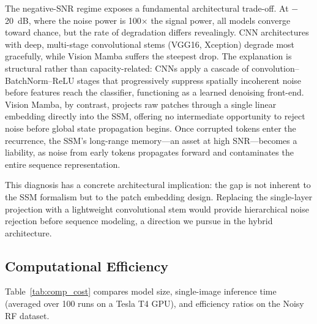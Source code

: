 \documentclass[runningheads]{llncs}
\begin{document}
The negative-SNR regime exposes a fundamental architectural trade-off. At $-$20~dB, where the noise power is 100$\times$ the signal power, all models converge toward chance, but the rate of degradation differs revealingly. CNN architectures with deep, multi-stage convolutional stems (VGG16, Xception) degrade most gracefully, while Vision Mamba suffers the steepest drop. The explanation is structural rather than capacity-related: CNNs apply a cascade of convolution--BatchNorm--ReLU stages that progressively suppress spatially incoherent noise before features reach the classifier, functioning as a learned denoising front-end. Vision Mamba, by contrast, projects raw patches through a single linear embedding directly into the SSM, offering no intermediate opportunity to reject noise before global state propagation begins. Once corrupted tokens enter the recurrence, the SSM's long-range memory---an asset at high SNR---becomes a liability, as noise from early tokens propagates forward and contaminates the entire sequence representation.

This diagnosis has a concrete architectural implication: the gap is not inherent to the SSM formalism but to the patch embedding design. Replacing the single-layer projection with a lightweight convolutional stem would provide hierarchical noise rejection before sequence modeling, a direction we pursue in the hybrid architecture.

\subsection{Computational Efficiency}

Table~\ref{tab:comp_cost} compares model size, single-image inference time (averaged over 100 runs on a Tesla T4 GPU), and efficiency ratios on the Noisy RF dataset.

\begin{table}[htbp]
\centering
\caption{Computational Cost Comparison (Noisy RF Dataset, Tesla T4 GPU)}
\label{tab:comp_cost}
\renewcommand{\arraystretch}{1.15}
\end{table}
\end{document}
